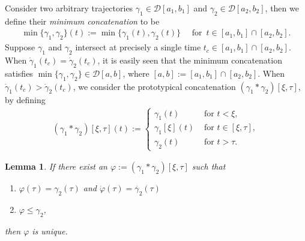\documentclass[a4paper]{article}
\theoremstyle{definition}
\theoremstyle{plain}
\newtheorem{lemma}{Lemma\hspace{0.25em}\ignorespaces}
\begin{document}
\newpage

Consider two arbitrary trajectories $\gamma_{1} \in \mathcal{D}[a_{1}, b_{1}]$
and $\gamma_{2} \in \mathcal{D}[a_{2}, b_{2}]$, then we define their
\emph{minimum concatenation} to be
\begin{align}
  \min\{ \gamma_{1}, \gamma_{2} \}(t) := \min\{ \gamma_{1}(t), \gamma_{2}(t) \}  \quad \text{ for } \, t \in [a_{1}, b_{1}] \cap [a_{2}, b_{2}] .
\end{align}
%
Suppose $\gamma_{1}$ and $\gamma_{2}$ intersect at precisely a single time
$t_{c} \in [a_{1},b_{1}] \cap [a_{2}, b_{2}]$. When
$\dot{\gamma}_{1}(t_{c}) = \dot{\gamma}_{2}(t_{c})$, it is easily seen that the
minimum concatenation satisfies
$\min\{\gamma_{1}, \gamma_{2} \} \in \mathcal{D}[a, b]$, where
$[a, b] := [a_{1}, b_{1}] \cap [a_{2}, b_{2}]$.
%
When $\dot{\gamma}_{1}(t_{c}) > \dot{\gamma}_{2}(t_{c})$, we consider the
prototypical concatenation $(\gamma_{1} * \gamma_{2})[\xi, \tau]$, by defining
\begin{align}
  (\gamma_{1} * \gamma_{2})[\xi, \tau](t) :=
  \begin{cases}
      \gamma_{1}(t) & \text{ for } t < \xi , \\
      \gamma_{1}[\xi](t) & \text{ for } t \in [\xi, \tau] , \\
      \gamma_{2}(t) & \text{ for } t > \tau .
  \end{cases}
\end{align}

\begin{lemma}\label{lemma:unique}
  If there exist an $\varphi := (\gamma_{1} * \gamma_{2})[\xi, \tau]$
  such that
  \begin{enumerate}[label=(\roman*)\quad,leftmargin=5em]
    \item $\varphi(\tau) = \gamma_{2}(\tau)$ and
          $\dot{\varphi}(\tau) = \dot{\gamma_{2}}(\tau)$
    \item $\varphi \leq \gamma_{2}$,
  \end{enumerate}
  then $\varphi$ is unique.
\end{lemma}


\newpage
\end{document}
